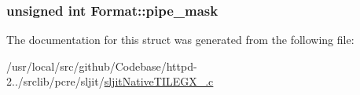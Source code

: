 \subsubsection[{\texorpdfstring{pipe\+\_\+mask}{pipe_mask}}]{\setlength{\rightskip}{0pt plus 5cm}unsigned {\bf int} Format\+::pipe\+\_\+mask}\hypertarget{structFormat_a1a8686c9c4d6960eee50abae997e1a2a}{}\label{structFormat_a1a8686c9c4d6960eee50abae997e1a2a}


The documentation for this struct was generated from the following file\+:\begin{DoxyCompactItemize}
\item 
/usr/local/src/github/\+Codebase/httpd-\/2../srclib/pcre/sljit/\hyperlink{sljitNativeTILEGX__64_8c}{sljit\+Native\+T\+I\+L\+E\+G\+X\+\_.\+c}\end{DoxyCompactItemize}
